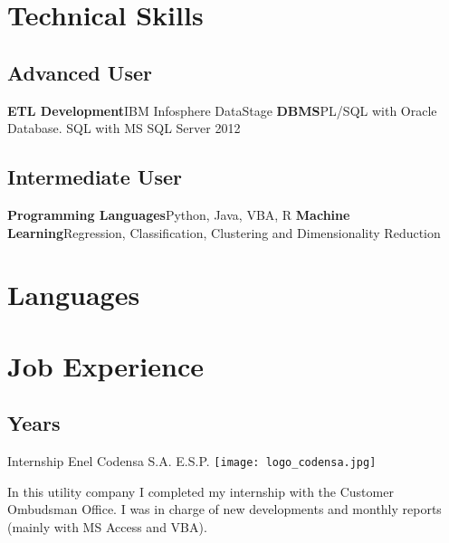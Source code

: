 \documentclass[11pt,letter,sans]{moderncv}
\begin{document}
\section{Technical Skills}
 
\subsection{Advanced User}
 
\cvdoubleitem %
{\textbf{ETL Development}}{{IBM Infosphere DataStage}}
{\textbf{DBMS}}{{PL/SQL with Oracle Database. SQL with MS SQL Server 2012}}
 
\subsection{Intermediate User}

\cvdoubleitem %
{\textbf{Programming Languages}}{{Python, Java, VBA, R}}
{\textbf{Machine Learning}}{{Regression, Classification, Clustering and Dimensionality Reduction}}

\section{Languages}
 

\section{Job Experience}
 
\subsection{Years}

{Internship} %
{Enel Codensa S.A. E.S.P.} %
{}
{} %
{\vspace{0.15cm}
  \texttt{[image: logo\_codensa.jpg]} %
  \vspace{0.15cm}}
 
\cvitem{}
{In this utility company I completed my internship with the Customer Ombudsman Office. I was in charge of new developments and monthly reports (mainly with MS Access and VBA).} %
\cvitem{}
{}
 
\end{document}
